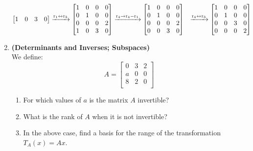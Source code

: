 \documentclass[red]{tutorial}
\theoremstyle{definition}
\theoremstyle{theorem}
\begin{document}
\begin{tutorial}
\begin{enumerate}
\begin{align*}
\begin{bmatrix}
          1 & 0 & 3 & 0
        \end{bmatrix}&\xrightarrow{\mathrm{r}_{1} \leftrightarrow \mathrm{r}_{3}}
          \begin{bmatrix}
            1 & 0 & 0 & 0 \\
            0 & 1 & 0 & 0 \\
            0 & 0 & 0 & 2 \\
            1 & 0 & 3 & 0
          \end{bmatrix}
          \xrightarrow{\mathrm{r}_{4} \to \mathrm{r}_{4}-\mathrm{r}_{1}}
          \begin{bmatrix}
            1 & 0 & 0 & 0 \\
            0 & 1 & 0 & 0 \\
            0 & 0 & 0 & 2 \\
            0 & 0 & 3 & 0
          \end{bmatrix}
          &\xrightarrow{\mathrm{r}_{4} \leftrightarrow \mathrm{r}_{3}}
          \begin{bmatrix}
            1 & 0 & 0 & 0 \\
            0 & 1 & 0 & 0 \\
            0 & 0 & 3 & 0 \\
            0 & 0 & 0 & 2
          \end{bmatrix}&&
          \end{align*}
        \item \textbf{(Determinants and Inverses; Subspaces)}\\
          We define:
          \begin{equation*}
            A = 
            \begin{bmatrix}
              0 & 3 & 2 \\
              a & 0 & 0 \\
              8 & 2 & 0 \\
            \end{bmatrix}
          \end{equation*}
          \begin{enumerate}
            \item For which values of $a$ is 
              the matrix $A$ invertible? 
            \item What is the rank of $A$ when it is not invertible?
            \item In the above case, find a basis for the range 
              of the transformation $T_A(x) = Ax$.
          \end{enumerate}

\end{enumerate}
\end{tutorial}
\end{document}
